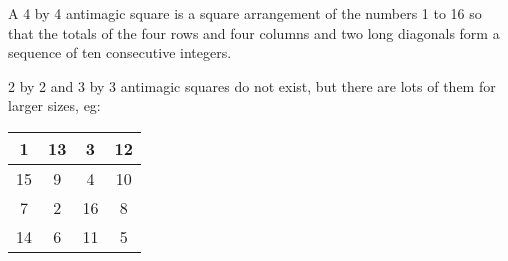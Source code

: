 A 4 by 4 antimagic square is a square arrangement of the numbers
1 to 16 so that the totals of the four rows and four
columns and two long diagonals form a sequence of ten
consecutive integers. 
\par
2 by 2 and 3 by 3 antimagic squares do not 
exist, but there are lots of them for larger sizes, eg: 
\begin{tabular}{|c|c|c|c|}
\hline
1 & 13 & 3 & 12\\
\hline
15 & 9 & 4 & 10\\
\hline
7 & 2 & 16 & 8\\
\hline
14 & 6 & 11 & 5\\
\hline 
\end{tabular}